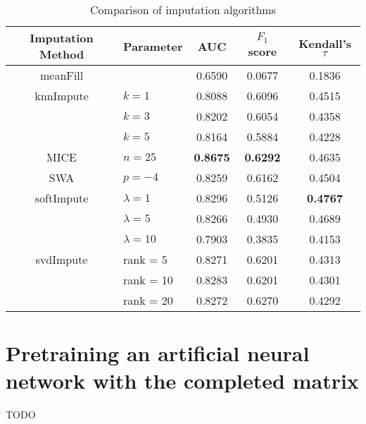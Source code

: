 \begin{table}[htbp]
\centering
\begin{tabular}{cl||ccc}
\toprule
Imputation Method & Parameter & AUC & $F_1$ score & Kendall's $\tau$ \\
\midrule 
meanFill &   & 0.6590  & 0.0677 & 0.1836 \\
\midrule 
knnImpute & $k = 1$ & 0.8088 & 0.6096 & 0.4515\\
  & $k = 3$ & 0.8202 & 0.6054 & 0.4358 \\
  & $k = 5$ & 0.8164 & 0.5884 & 0.4228 \\
\midrule
MICE & $n = 25$ & \bf{0.8675} & \bf{0.6292} & 0.4635 \\
\midrule
SWA & $p = -4$ & 0.8259 & 0.6162 & 0.4504 \\
\midrule
softImpute & $\lambda=1$ & 0.8296 & 0.5126 & \bf{0.4767} \\
& $\lambda=5$ & 0.8266 & 0.4930 & 0.4689 \\
& $\lambda=10$ & 0.7903 & 0.3835 & 0.4153 \\
\midrule
svdImpute & rank = 5 & 0.8271 & 0.6201 & 0.4313 \\
& rank = 10 & 0.8283 & 0.6201 & 0.4301 \\
& rank = 20 & 0.8272 & 0.6270 & 0.4292  \\
\bottomrule[1.25pt]
\end{tabular}
\begin{center}
\caption{Comparison of imputation algorithms}
\end{center}
\end{table}

\section*{Pretraining an artificial neural network with the completed matrix}

TODO
